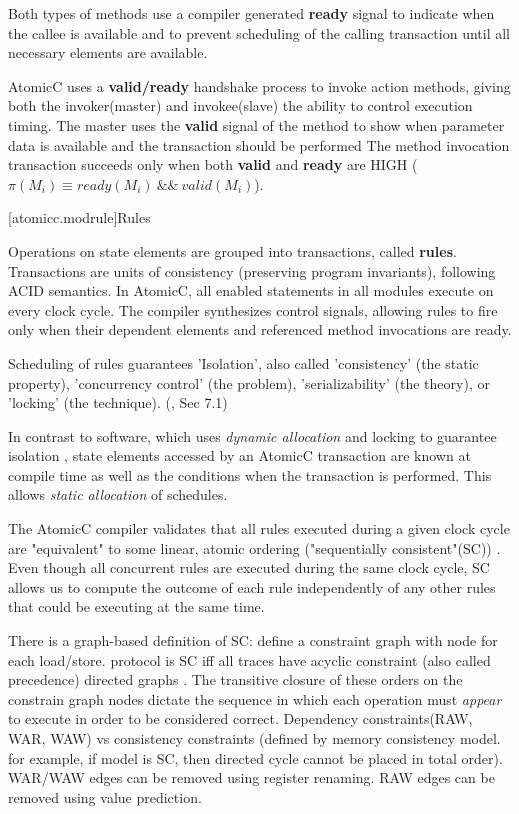 Both types of methods use a compiler generated \textbf{ready} signal
to indicate when the callee is available and
to prevent scheduling of the calling transaction until all necessary elements are
available.

AtomicC uses a \textbf{valid/ready} handshake process\cite{Fletcher2009, AXISpec} to invoke action methods,
giving both the invoker(master) and invokee(slave) the ability to control execution timing.
The master uses the \textbf{valid} signal
of the method to show when parameter data is available and the transaction should be performed
The method invocation transaction succeeds only when
both \textbf{valid} and \textbf{ready} are HIGH ($\pi(M_{i}) \equiv ready(M_{i})\ \&\&\ valid(M_{i})$).

[atomicc.modrule]{Rules}

Operations on state elements are grouped into transactions, called \textbf{rules}.
Transactions are units of consistency (preserving program invariants), following ACID semantics.
In AtomicC, all enabled statements in all modules execute on every clock cycle.
The compiler synthesizes control signals, allowing rules to fire
only when their dependent elements and referenced method invocations are ready.

Scheduling of rules guarantees 'Isolation',
also called 'consistency' (the static property), 'concurrency control'
(the problem), 'serializability' (the theory), or 'locking' (the technique). (\cite{GrayR93}, Sec 7.1)

In contrast to software, which uses \textit{dynamic allocation} and locking to guarantee isolation
\cite[p.~377]{GrayR93} \cite[Sec.~11.2]{OV11},
state elements accessed by an AtomicC transaction are known at compile time as well as the
conditions when the transaction is performed.  This allows \textit{static allocation}
\cite[Sec.~7.3.1]{GrayR93} of schedules.

The AtomicC compiler
validates that all rules executed during a given clock cycle are "equivalent"
to some linear, atomic ordering ("sequentially consistent"(SC))
\cite{Lamport:1979:MMC:1311099.1311750}.
Even though all concurrent rules are executed during the same clock cycle,
SC allows us to compute the
outcome of each rule independently of any other rules that could be executing at the same time.

There is a graph-based definition of SC: define a constraint graph with node for each load/store.
protocol is SC iff all traces have acyclic constraint (also called precedence) directed graphs
\cite{Cain2003}.
The transitive closure of these orders on the constrain graph nodes dictate
the sequence in which each operation must \textit{appear} to execute in order to
be considered correct.
Dependency constraints(RAW, WAR, WAW) vs consistency constraints (defined by memory consistency model.  for example, if model is SC, then directed cycle cannot be placed in total order).
WAR/WAW edges can be removed using register renaming.  RAW edges
can be removed using value prediction.

